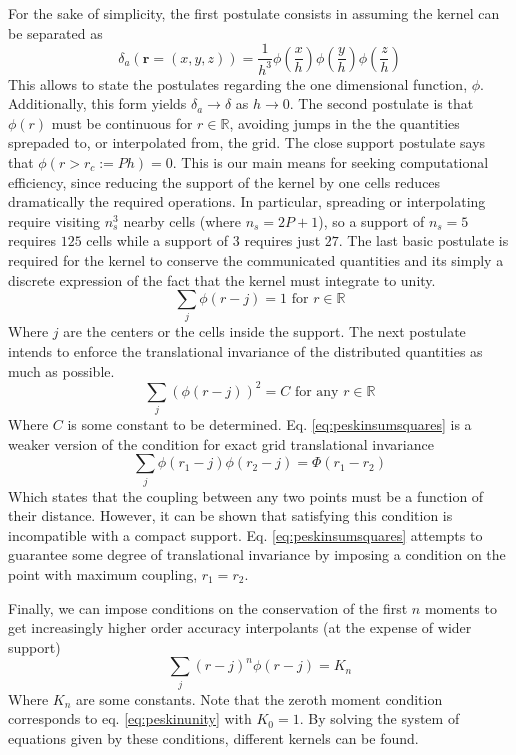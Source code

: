 \documentclass[ twoside,openright,titlepage,numbers=noenddot,%
headinclude,footinclude,cleardoublepage=empty,abstract=on,
BCOR=5mm,paper=a4,fontsize=11pt, dvipsnames
]{scrreprt}
\renewcommand{\vec}[1]{\bm{#1}}
\begin{document}
For the sake of simplicity, the first postulate consists in assuming the kernel can be separated as
\begin{equation}
  \label{eq:peskinseparable}
  \delta_a(\vec{r}=(x,y,z)) =\frac{1}{h^3}\phi\left(\frac{x}{h}\right)\phi\left(\frac{y}{h}\right)\phi\left(\frac{z}{h}\right)
\end{equation}
This allows to state the postulates regarding the one dimensional function, $\phi$. Additionally, this form yields $\delta_a\rightarrow\delta$ as $h\rightarrow 0$.
The second postulate is that $\phi(r)$ must be continuous for $r\in\mathbb R$, avoiding jumps in the the quantities sprepaded to, or interpolated from, the grid. The close support postulate says that $\phi(r>r_c := Ph) = 0$. This is our main means for seeking computational efficiency, since reducing the support of the kernel by one cells reduces dramatically the required operations. In particular, spreading or interpolating require visiting $n_s^3$ nearby cells (where $n_s = 2P +1$), so a support of $n_s=5$ requires $125$ cells while a support of $3$ requires just $27$.
The last basic postulate is required for the kernel to conserve the communicated quantities and its simply a discrete expression of the fact that the kernel must integrate to unity.
\begin{equation}
  \label{eq:peskinunity}
  \sum_j \phi(r-j) = 1 \textrm{ for } r\in\mathbb R
\end{equation}
Where $j$ are the centers or the cells inside the support.
The next postulate intends to enforce the translational invariance of the distributed quantities as much as possible.
\begin{equation}
  \label{eq:peskinsumsquares}
  \sum_j\left(\phi(r-j)\right)^2 = C \textrm{ for any } r\in\mathbb R
\end{equation}
Where $C$ is some constant to be determined. Eq. \eqref{eq:peskinsumsquares} is a weaker version of the condition for exact grid translational invariance
\begin{equation}
  \sum_j\phi(r_1-j)\phi(r_2-j) = \Phi(r_1-r_2)
\end{equation}
Which states that the coupling between any two points must be a function of their distance. However, it can be shown that satisfying this condition is incompatible with a compact support\cite{Peskin2002}. Eq. \eqref{eq:peskinsumsquares} attempts to guarantee some degree of translational invariance by imposing a condition on the point with maximum coupling, $r_1 = r_2$.

Finally, we can impose conditions on the conservation of the first $n$ moments to get increasingly higher order accuracy interpolants (at the expense of wider support)
\begin{equation}
  \sum_j(r-j)^n\phi(r-j) = K_n
\end{equation}
Where $K_n$ are some constants. Note that the zeroth moment condition corresponds to eq. \eqref{eq:peskinunity} with $K_0 = 1$.
By solving the system of equations given by these conditions, different kernels can be found. 
\end{document}

